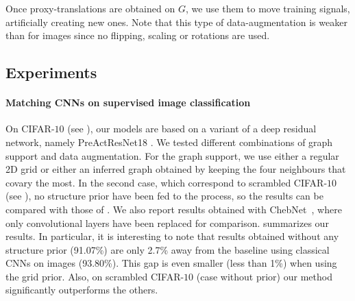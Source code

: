 Once proxy-translations are obtained on $G$, we use them to move training signals, artificially creating new ones. Note that this type of data-augmentation is weaker than for images since no flipping, scaling or rotations are used.

\subsection{Experiments}

\paragraph{Matching CNNs on supervised image classification}
On CIFAR-$10$ (see ), our models are based on a variant of a deep residual network, namely PreActResNet18 \citep{he2016identity}. We tested different combinations of graph support and data augmentation. For the graph support, we use either a regular 2D grid or either an inferred graph obtained by keeping the four neighbours that covary the most. In the second case, which correspond to scrambled CIFAR-$10$ (see ), no structure prior have been fed to the process, so the results can be compared with those of \cite{lin2015}. We also report results obtained with ChebNet~\citep{defferrard2016convolutional}, where only convolutional layers have been replaced for comparison.  summarizes our results. In particular, it is interesting to note that results obtained without any structure prior (91.07\%) are only 2.7\% away from the baseline using classical CNNs on images (93.80\%). This gap is even smaller (less than 1\%) when using the grid prior. Also, on scrambled CIFAR-$10$ (case without prior) our method significantly outperforms the others.%


